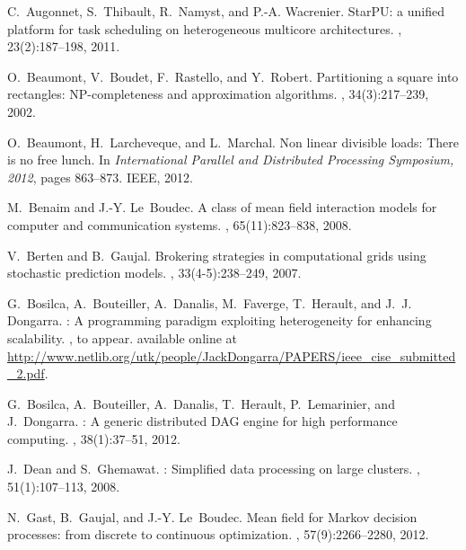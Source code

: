 \documentclass[a4paper,10pt]{article}
\begin{document}
\begin{thebibliography}{10}

C.~Augonnet, S.~Thibault, R.~Namyst, and P.-A. Wacrenier.
\newblock StarPU: a unified platform for task scheduling on heterogeneous
  multicore architectures.
,
  23(2):187--198, 2011.

O.~Beaumont, V.~Boudet, F.~Rastello, and Y.~Robert.
\newblock Partitioning a square into rectangles: NP-completeness and
  approximation algorithms.
, 34(3):217--239, 2002.

O.~Beaumont, H.~Larcheveque, and L.~Marchal.
\newblock Non linear divisible loads: There is no free lunch.
\newblock In {\em International Parallel and Distributed Processing Symposium,
  2012}, pages 863--873. IEEE, 2012.

M.~Benaim and J.-Y. Le~Boudec.
\newblock A class of mean field interaction models for computer and
  communication systems.
, 65(11):823--838, 2008.

V.~Berten and B.~Gaujal.
\newblock Brokering strategies in computational grids using stochastic
  prediction models.
, 33(4-5):238--249, 2007.

G.~Bosilca, A.~Bouteiller, A.~Danalis, M.~Faverge, T.~Herault, and J.~J.
  Dongarra.
: A programming paradigm exploiting heterogeneity for
  enhancing scalability.
, to appear.
\newblock available online at
  \url{http://www.netlib.org/utk/people/JackDongarra/PAPERS/ieee_cise_submitted_2.pdf}.


G.~Bosilca, A.~Bouteiller, A.~Danalis, T.~Herault, P.~Lemarinier, and
  J.~Dongarra.
: A generic distributed DAG engine for high performance
  computing.
, 38(1):37--51, 2012.



J.~Dean and S.~Ghemawat.
: Simplified data processing on large clusters.
, 51(1):107--113, 2008.

N.~Gast, B.~Gaujal, and J.-Y. Le~Boudec.
\newblock Mean field for Markov decision processes: from discrete to continuous
  optimization.
, 57(9):2266--2280, 2012.


\end{thebibliography}
\end{document}
